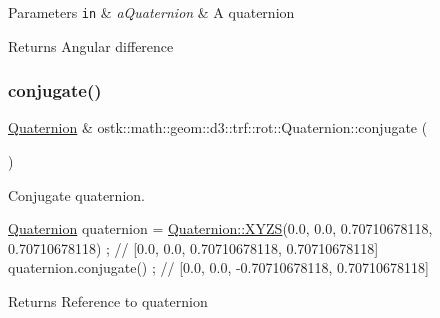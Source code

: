 \begin{DoxyParams}[1]{Parameters}
\mbox{\tt in}  & {\em a\+Quaternion} & A quaternion \\
\hline
\end{DoxyParams}
\begin{DoxyReturn}{Returns}
Angular difference 
\end{DoxyReturn}
\mbox{\label{classostk_1_1math_1_1geom_1_1d3_1_1trf_1_1rot_1_1_quaternion_a7d975785f2a7f4cc83d9410e37908b11}} 
\subsubsection{\texorpdfstring{conjugate()}{conjugate()}}
{\footnotesize\ttfamily \hyperlink{classostk_1_1math_1_1geom_1_1d3_1_1trf_1_1rot_1_1_quaternion}{Quaternion} \& ostk\+::math\+::geom\+::d3\+::trf\+::rot\+::\+Quaternion\+::conjugate (\begin{DoxyParamCaption}{ }\end{DoxyParamCaption})}



Conjugate quaternion. 


\begin{DoxyCode}
\hyperlink{classostk_1_1math_1_1geom_1_1d3_1_1trf_1_1rot_1_1_quaternion_ad9fd7d8eb5effb4d4e0394bbb5bb86dc}{Quaternion} quaternion = \hyperlink{classostk_1_1math_1_1geom_1_1d3_1_1trf_1_1rot_1_1_quaternion_ac57ea57a4033622ed1389101b2e58c76}{Quaternion::XYZS}(0.0, 0.0, 0.70710678118, 0.70710678118) 
      ; \textcolor{comment}{// [0.0, 0.0, 0.70710678118, 0.70710678118]}
quaternion.conjugate() ; \textcolor{comment}{// [0.0, 0.0, -0.70710678118, 0.70710678118]}
\end{DoxyCode}


\begin{DoxyReturn}{Returns}
Reference to quaternion 
\end{DoxyReturn}
\mbox{\label{classostk_1_1math_1_1geom_1_1d3_1_1trf_1_1rot_1_1_quaternion_a324f12e547fbeb114b4db5f9f26ae46f}} 
